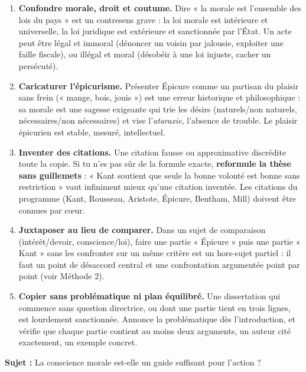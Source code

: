 \documentclass[11pt]{article}
\begin{document}
\begin{attention}
\begin{enumerate}
\item \textbf{Confondre morale, droit et coutume.} Dire « la morale est l'ensemble des lois du pays » est un contresens grave : la loi morale est intérieure et universelle, la loi juridique est extérieure et sanctionnée par l'État. Un acte peut être légal et immoral (dénoncer un voisin par jalousie, exploiter une faille fiscale), ou illégal et moral (désobéir à une loi injuste, cacher un persécuté).
\item \textbf{Caricaturer l'épicurisme.} Présenter Épicure comme un partisan du plaisir sans frein (« mange, bois, jouis ») est une erreur historique et philosophique : sa morale est une sagesse exigeante qui trie les désirs (naturels/non naturels, nécessaires/non nécessaires) et vise l'\emph{ataraxie}, l'absence de trouble. Le plaisir épicurien est stable, mesuré, intellectuel.
\item \textbf{Inventer des citations.} Une citation fausse ou approximative discrédite toute la copie. Si tu n'es pas sûr de la formule exacte, \textbf{reformule la thèse sans guillemets} : « Kant soutient que seule la bonne volonté est bonne sans restriction » vaut infiniment mieux qu'une citation inventée. Les citations du programme (Kant, Rousseau, Aristote, Épicure, Bentham, Mill) doivent être connues par cœur.
\item \textbf{Juxtaposer au lieu de comparer.} Dans un sujet de comparaison (intérêt/devoir, conscience/loi), faire une partie « Épicure » puis une partie « Kant » sans les confronter sur un même critère est un hors-sujet partiel : il faut un point de désaccord central et une confrontation argumentée point par point (voir Méthode 2).
\item \textbf{Copier sans problématique ni plan équilibré.} Une dissertation qui commence sans question directrice, ou dont une partie tient en trois lignes, est lourdement sanctionnée. Annonce la problématique dès l'introduction, et vérifie que chaque partie contient au moins deux arguments, un auteur cité exactement, un exemple concret.
\end{enumerate}
\end{attention}

\begin{exercice}
\textbf{Sujet :} La conscience morale est-elle un guide suffisant pour l'action ?
\end{exercice}
\end{document}
